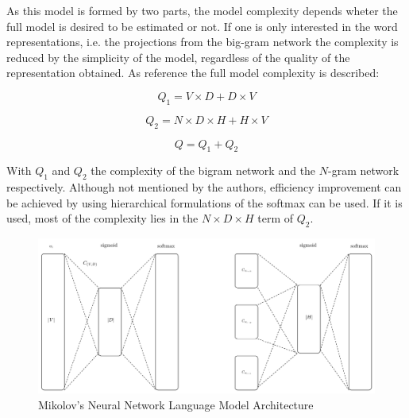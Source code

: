 As this model is formed by two parts, the model complexity depends wheter the
full model is desired to be estimated or not. If one is only interested in
the word representations, i.e. the projections from the big-gram network the
complexity is reduced  by the simplicity of the model, regardless of the
quality of the representation obtained.  As reference the full model
complexity is described: 


\begin{equation} Q_1 = V \times D + D \times V  \end{equation}

\begin{equation} Q_2 =  N \times D \times H + H \times V   \end{equation}

\begin{equation} Q = Q_1 + Q_2
\end{equation}

With $Q_1$ and $Q_2$ the complexity of the bigram network and the $N$-gram
network respectively. Although not mentioned by the authors, efficiency
improvement can be achieved by using hierarchical formulations of the softmax
can be used. If it is used, most of the complexity  lies in the  $N \times D \times
H$ term of $Q_2$.

\begin{figure}[hptb!]
    \centering
    \includegraphics[width=1.0\textwidth]{images/mikolov-fnnl-latex.pdf} 
    \caption{Mikolov's Neural Network Language Model Architecture}
    \label{fig:mikolov_nnlm_architecture}
\end{figure}
  




